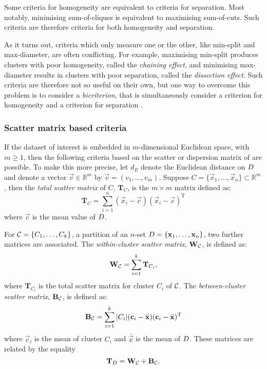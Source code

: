 Some criteria for homogeneity are equivalent to criteria for separation.  Most
notably, minimising sum-of-cliques is equivalent to maximising sum-of-cuts.
Such criteria are therefore criteria for both homogeneity and separation.

As it turns out, criteria which only measure one or the other, like min-split
and max-diameter, are often conflicting.  For example, maximising min-split
produces clusters with poor homogeneity, called the \textit{chaining effect},
and minimising max-diameter results in clusters with poor separation, called
the \textit{dissection effect}.  Such criteria are therefore not so useful on
their own, but one way to overcome this problem is to consider a
\textit{bicriterion}, that is simultaneously consider a criterion for
homogeneity and a criterion for separation \citep{delattre1980bicriterion}.

\subsubsection{Scatter matrix based criteria}
\label{sec:scatter-matrix-based}

If the dataset of interest is embedded in $m$-dimensional Euclidean space,
with $m \geq 1$, then the following criteria based on the scatter or
dispersion matrix of \citet{wilks60} are possible.  To make this more precise,
let $d_E$ denote the Euclidean distance on $D$ and denote a vector
$\vec{v} \in \mathbb{R}^m$ by $\vec{v} = (v_1,\dotsc,v_m)$.  Suppose $C =
\{\vec{x}_1,\dotsc,\vec{x}_n\} \subset \mathbb{R}^m$, then the \textit{total
  scatter matrix} of $C$, $\mathbf{T}_{C}$, is the $m \times m$ matrix defined
as:
\begin{equation*}
  \mathbf{T}_{C} = \sum_{i=1}^{n} (\vec{x}_i - \vec{c})(\vec{x}_i - \vec{c})^{\mathrm{T}}
\end{equation*}
where $\vec{c}$ is the mean value of $D$.

For $\mathcal{C} = \{C_1,\dotsc,C_k\}$, a partition of an $n$-set $D =
\{\mathbf{x}_1,\dotsc,\mathbf{x}_n\}$, two further matrices are associated.  The
\textit{within-cluster scatter matrix}, $\mathbf{W}_{\mathcal{C}}$, is defined as:
\begin{equation*}
\mathbf{W}_{\mathcal{C}} = \sum_{i=1}^{k} \mathbf{T}_{C_i},
\end{equation*}
where $\mathbf{T}_{C_i}$ is the total scatter matrix for cluster $C_i$ of
$\mathcal{C}$.  The \textit{between-cluster scatter matrix}, $\mathbf{B}_{\mathcal{C}}$,
is defined as:
\begin{equation*}
  \mathbf{B}_{\mathcal{C}} =
  \sum_{i=1}^{k} |C_i| (\mathbf{c}_i - \bar{\mathbf{x}}) (\mathbf{c}_i -
  \bar{\mathbf{x}})^{\mathrm{T}}
\end{equation*}
where $\vec{c}_i$ is the mean of cluster $C_i$ and $\bar{\vec{x}}$ is the mean
of $D$.  These matrices are related by the equality
\begin{equation*}
  \mathbf{T}_{D} = \mathbf{W}_{\mathcal{C}} + \mathbf{B}_{\mathcal{C}}.
\end{equation*}

